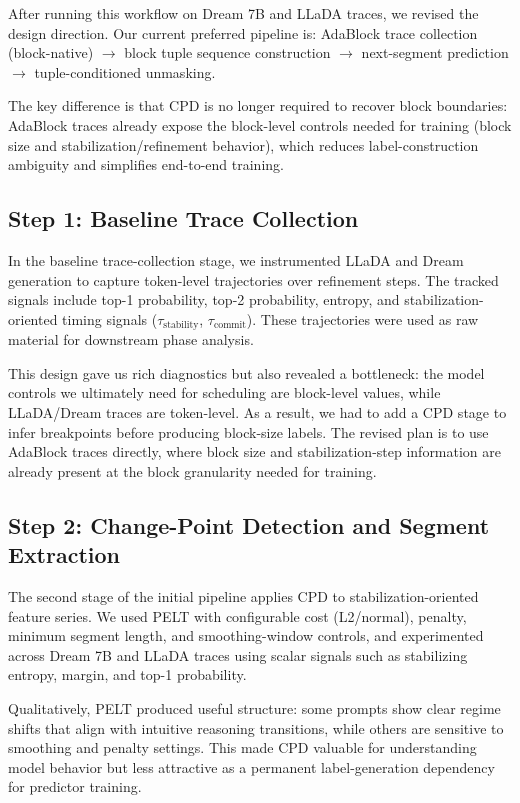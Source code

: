 \documentclass[11pt]{article}
\begin{document}
After running this workflow on Dream 7B and LLaDA traces, we revised the design direction. Our current preferred pipeline is:
AdaBlock trace collection (block-native) $\rightarrow$ block tuple sequence construction $\rightarrow$ next-segment prediction $\rightarrow$ tuple-conditioned unmasking.

The key difference is that CPD is no longer required to recover block boundaries: AdaBlock traces already expose the block-level controls needed for training (block size and stabilization/refinement behavior), which reduces label-construction ambiguity and simplifies end-to-end training.

\subsection{Step 1: Baseline Trace Collection}

In the baseline trace-collection stage, we instrumented LLaDA and Dream generation to capture token-level trajectories over refinement steps. The tracked signals include top-1 probability, top-2 probability, entropy, and stabilization-oriented timing signals ($\tau_{\text{stability}}$, $\tau_{\text{commit}}$). These trajectories were used as raw material for downstream phase analysis.

This design gave us rich diagnostics but also revealed a bottleneck: the model controls we ultimately need for scheduling are block-level values, while LLaDA/Dream traces are token-level. As a result, we had to add a CPD stage to infer breakpoints before producing block-size labels. The revised plan is to use AdaBlock traces directly, where block size and stabilization-step information are already present at the block granularity needed for training.

\subsection{Step 2: Change-Point Detection and Segment Extraction}

The second stage of the initial pipeline applies CPD to stabilization-oriented feature series. We used PELT with configurable cost (L2/normal), penalty, minimum segment length, and smoothing-window controls, and experimented across Dream 7B and LLaDA traces using scalar signals such as stabilizing entropy, margin, and top-1 probability.

Qualitatively, PELT produced useful structure: some prompts show clear regime shifts that align with intuitive reasoning transitions, while others are sensitive to smoothing and penalty settings. This made CPD valuable for understanding model behavior but less attractive as a permanent label-generation dependency for predictor training.
\end{document}
